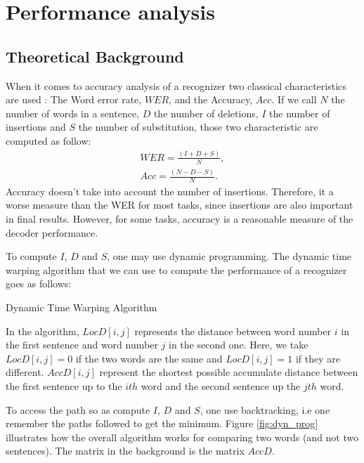 \section*{Performance analysis}
\subsection*{Theoretical Background}
When it comes to accuracy analysis of a recognizer two classical characteristics are used : The Word error rate, $WER$, and the Accuracy, $Acc$. If we call $N$ the number of words in a sentence, $D$ the number of deletions, $I$ the number of insertions and $S$ the number of substitution, those two characteristic are computed as follow: 
\begin{align*}
WER = \frac{(I + D + S)}{N},\\
Acc = \frac{(N-D-S)}{N}.
\end{align*}
Accuracy doesn't take into account the number of insertions. Therefore, it a worse measure than the WER for most tasks, since insertions are also important in final results. However, for some tasks, accuracy is a reasonable measure of the decoder performance. 

To compute $I$, $D$ and $S$, one may use dynamic programming. The dynamic time warping algorithm that we can use to compute the performance of a recognizer goes as follows:

\begin{algorithm}[H]
\caption{Dynamic Time Warping Algorithm}
\end{algorithm}

In the algorithm, $LocD[i,j]$ represents the distance between word number $i$ in the first sentence and word number $j$ in the second one. Here, we take  $LocD[i,j] = 0$ if the two words are the same and $LocD[i,j] = 1$ if they are different. $AccD[i,j]$ represent the shortest possible accumulate distance between the first sentence up to the $ith$ word and the second sentence up the $jth$ word. 

To access the path so as compute $I$, $D$ and $S$, one use backtracking, i.e one remember the paths followed to get the minimum. Figure \ref{fig:dyn_prog} illustrates how the overall algorithm works for comparing two words (and not two sentences). The matrix in the background is the matrix $AccD$.

